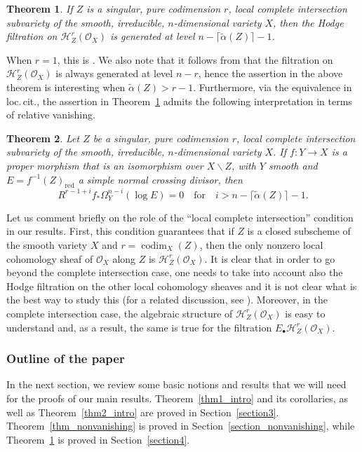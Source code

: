 \documentclass[JEP,XML,SOM,Unicode]{cedram}
\newcommand{\sbullet}{{\scriptscriptstyle\bullet}}
\theoremstyle{plain}
\newtheorem{thm}{Theorem}[section]
\theoremstyle{definition}
\newcommand\cH{\mathcal{H}}
\newcommand\cO{\mathcal{O}}
\newcommand\cH{\mathcal{H}}
\newcommand\cO{\mathcal{O}}
\DeclareMathOperator{\codim}{codim}
\begin{document}
\begin{thm}\label{thm4_intro}
If $Z$ is a singular, pure codimension $r$, local complete intersection subvariety of the smooth, irreducible, $n$-dimensional variety $X$, then the Hodge filtration
on $\cH^r_Z(\cO_X)$ is generated at level $n-\lceil\widetilde{\alpha}(Z)\rceil-1$.
\end{thm}

When $r=1$, this is \cite[Th.\,A]{MP0}.
We also note that it follows from \cite[Th.\,4.2]{MP1} that the filtration on $\cH^r_Z(\cO_X)$ is always generated at level $n-r$, hence the assertion in the above theorem is interesting when $\widetilde{\alpha}(Z)>r-1$. Furthermore, via the equivalence in loc.\,cit., the assertion in Theorem~\ref{thm4_intro}
admits the following interpretation in terms of relative vanishing.\enlargethispage{\baselineskip}%

\begin{thm}\label{thm5_intro}
Let $Z$ be a singular, pure codimension $r$, local complete intersection subvariety of the smooth, irreducible, $n$-dimensional variety $X$. If $f\colon Y\to X$
is a proper morphism that is an isomorphism over $X\smallsetminus Z$, with $Y$ smooth and $E=f^{-1}(Z)_\mathrm{red}$ a simple normal crossing divisor, then
\[R^{r-1+i}f_*\Omega_Y^{n-i}(\log E)=0\quad\text{for}\quad i>n-\lceil\widetilde{\alpha}(Z)\rceil-1.\]
\end{thm}

Let us comment briefly on the role of the ``local complete intersection'' condition in our results. First, this condition guarantees that if $Z$ is a closed subscheme
of the smooth variety $X$ and $r=\codim_X(Z)$, then the only nonzero local cohomology sheaf of $\cO_X$ along $Z$ is $\cH^r_Z(\cO_X)$. It is clear that in order to
go beyond the complete intersection case, one needs to take into account also the Hodge filtration on the other local cohomology sheaves and it is not clear what is the best way to study this (for a related discussion,
see \cite[\S 3]{MP1}). Moreover, in the complete intersection case, the
algebraic structure of $\cH^r_Z(\cO_X)$ is easy to understand and, as a result, the same is true for the filtration $E_{\sbullet}\cH^r_Z(\cO_X)$.

\subsubsection*{Outline of the paper}
In the next section, we review some basic notions and results that we will need for the proofs of our main results.
Theorem~\ref{thm1_intro} and its corollaries, as well as Theorem~\ref{thm2_intro} are proved in Section~\ref{section3}. Theorem~\ref{thm_nonvanishing}
is proved in Section~\ref{section_nonvanishing},
while Theorem~\ref{thm4_intro} is proved in Section~\ref{section4}.
\end{document}

